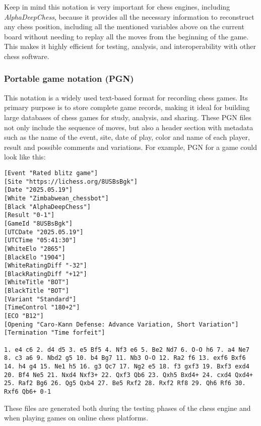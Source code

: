 \noindent Keep in mind this notation is very important for chess engines, including \textit{AlphaDeepChess}, because it provides all the necessary information to reconstruct any chess position, including all the mentioned variables above on the current board without needing to replay all the moves from the beginning of the game. This makes it highly efficient for testing, analysis, and interoperability with other chess software.

\subsubsection*{Portable game notation (PGN)}

This notation is a widely used text-based format for recording chess games. Its primary purpose is to store complete game records, making it ideal for building large databases of chess games for study, analysis, and sharing. These PGN files not only include the sequence of moves, but also a header section with metadata such as the name of the event, site, date of play, color and name of each player, result and possible comments and variations. For example, PGN for a game could look like this:

\vspace{1em}

\begin{lstlisting}[basicstyle=\ttfamily\small, captionpos=b, breaklines=true, frame=single, caption={Example of a PGN file}, label={lst:pgn-example}]
[Event "Rated blitz game"]
[Site "https://lichess.org/8USBsBgk"]
[Date "2025.05.19"]
[White "Zimbabwean_chessbot"]
[Black "AlphaDeepChess"]
[Result "0-1"]
[GameId "8USBsBgk"]
[UTCDate "2025.05.19"]
[UTCTime "05:41:30"]
[WhiteElo "2865"]
[BlackElo "1904"]
[WhiteRatingDiff "-32"]
[BlackRatingDiff "+12"]
[WhiteTitle "BOT"]
[BlackTitle "BOT"]
[Variant "Standard"]
[TimeControl "180+2"]
[ECO "B12"]
[Opening "Caro-Kann Defense: Advance Variation, Short Variation"]
[Termination "Time forfeit"]

1. e4 c6 2. d4 d5 3. e5 Bf5 4. Nf3 e6 5. Be2 Nd7 6. O-O h6 7. a4 Ne7 8. c3 a6 9. Nbd2 g5 10. b4 Bg7 11. Nb3 O-O 12. Ra2 f6 13. exf6 Bxf6 14. h4 g4 15. Ne1 h5 16. g3 Qc7 17. Ng2 e5 18. f3 gxf3 19. Bxf3 exd4 20. Bf4 Ne5 21. Nxd4 Nxf3+ 22. Qxf3 Qb6 23. Qxh5 Bxd4+ 24. cxd4 Qxd4+ 25. Raf2 Bg6 26. Qg5 Qxb4 27. Be5 Rxf2 28. Rxf2 Rf8 29. Qh6 Rf6 30. Rxf6 Qb6+ 0-1
\end{lstlisting}

These files are generated both during the testing phases of the chess engine and when playing games on online chess platforms.
